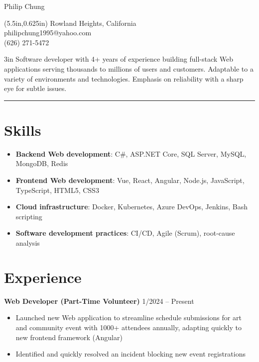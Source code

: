 \documentclass[12pt]{article}
\newcommand{\primaryheader}[4]{
	\textbf{#1}
	\ifthenelse{\equal{#3}{}}{}{%
		\symbol{"B7} #3 \ifthenelse{\equal{#4}{}}{}{(#4)}
	}
	\hfill #2%
}
\begin{document}
	{\headerfont\fontsize{24pt}{24pt}\selectfont Philip Chung}

	\begin{textblock*}{2.5in}(5.5in,0.625in)
		\fontsize{12pt}{18pt}\selectfont
		\raggedleft
		Rowland Heights, California \\ philipchung1995@yahoo.com \\ (626) 271-5472
	\end{textblock*}

	\vspace{0.5em}

	\begin{adjustwidth}{}{3in}
		\fontsize{10pt}{12pt}\selectfont
		Software developer with 4+ years of experience building full-stack Web applications serving thousands to millions of users and customers. Adaptable to a variety of environments and technologies. Emphasis on reliability with a sharp eye for subtle issues.
	\end{adjustwidth}

	\rule{4.75in}{1pt}

	\section*{Skills}

	\newcommand{\skillitem}[2]{\item \textbf{#1}: #2}

	\begin{itemize}[left=0.25in .. 0.25in,label={},itemindent=-0.25in]
		\skillitem{Backend Web development}{C\#, ASP.NET Core, SQL Server, MySQL, MongoDB, Redis}
		\skillitem{Frontend Web development}{Vue, React, Angular, Node.js, JavaScript, TypeScript, HTML5, CSS3}
		\skillitem{Cloud infrastructure}{Docker, Kubernetes, Azure DevOps, Jenkins, Bash scripting}
		\skillitem{Software development practices}{CI/CD, Agile (Scrum), root-cause analysis}
	\end{itemize}

	\section*{Experience}

	\primaryheader{Web Developer (Part-Time Volunteer)}{1/2024 -- Present}{PNW}{Remote}

	\begin{itemize}
		\item Launched new Web application to streamline schedule submissions for art and community event with 1000+ attendees annually, adapting quickly to new frontend framework (Angular)
		\item Identified and quickly resolved an incident blocking new event registrations
	\end{itemize}
\end{document}
